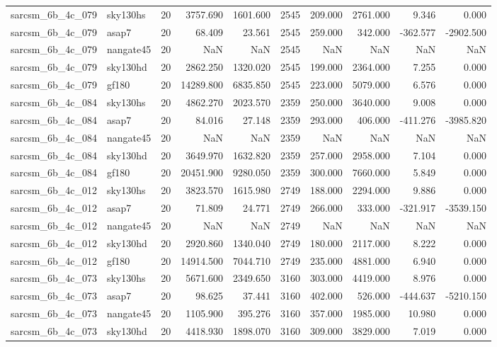 \documentclass{article}
\begin{document}
\begin{longtable}{llrrrrrrrr}
sarcsm\_6b\_4c\_079 & sky130hs & 20 & 3757.690 & 1601.600 & 2545 & 209.000 & 2761.000 & 9.346 & 0.000 \\
sarcsm\_6b\_4c\_079 & asap7 & 20 & 68.409 & 23.561 & 2545 & 259.000 & 342.000 & -362.577 & -2902.500 \\
sarcsm\_6b\_4c\_079 & nangate45 & 20 & NaN & NaN & 2545 & NaN & NaN & NaN & NaN \\
sarcsm\_6b\_4c\_079 & sky130hd & 20 & 2862.250 & 1320.020 & 2545 & 199.000 & 2364.000 & 7.255 & 0.000 \\
sarcsm\_6b\_4c\_079 & gf180 & 20 & 14289.800 & 6835.850 & 2545 & 223.000 & 5079.000 & 6.576 & 0.000 \\
sarcsm\_6b\_4c\_084 & sky130hs & 20 & 4862.270 & 2023.570 & 2359 & 250.000 & 3640.000 & 9.008 & 0.000 \\
sarcsm\_6b\_4c\_084 & asap7 & 20 & 84.016 & 27.148 & 2359 & 293.000 & 406.000 & -411.276 & -3985.820 \\
sarcsm\_6b\_4c\_084 & nangate45 & 20 & NaN & NaN & 2359 & NaN & NaN & NaN & NaN \\
sarcsm\_6b\_4c\_084 & sky130hd & 20 & 3649.970 & 1632.820 & 2359 & 257.000 & 2958.000 & 7.104 & 0.000 \\
sarcsm\_6b\_4c\_084 & gf180 & 20 & 20451.900 & 9280.050 & 2359 & 300.000 & 7660.000 & 5.849 & 0.000 \\
sarcsm\_6b\_4c\_012 & sky130hs & 20 & 3823.570 & 1615.980 & 2749 & 188.000 & 2294.000 & 9.886 & 0.000 \\
sarcsm\_6b\_4c\_012 & asap7 & 20 & 71.809 & 24.771 & 2749 & 266.000 & 333.000 & -321.917 & -3539.150 \\
sarcsm\_6b\_4c\_012 & nangate45 & 20 & NaN & NaN & 2749 & NaN & NaN & NaN & NaN \\
sarcsm\_6b\_4c\_012 & sky130hd & 20 & 2920.860 & 1340.040 & 2749 & 180.000 & 2117.000 & 8.222 & 0.000 \\
sarcsm\_6b\_4c\_012 & gf180 & 20 & 14914.500 & 7044.710 & 2749 & 235.000 & 4881.000 & 6.940 & 0.000 \\
sarcsm\_6b\_4c\_073 & sky130hs & 20 & 5671.600 & 2349.650 & 3160 & 303.000 & 4419.000 & 8.976 & 0.000 \\
sarcsm\_6b\_4c\_073 & asap7 & 20 & 98.625 & 37.441 & 3160 & 402.000 & 526.000 & -444.637 & -5210.150 \\
sarcsm\_6b\_4c\_073 & nangate45 & 20 & 1105.900 & 395.276 & 3160 & 357.000 & 1985.000 & 10.980 & 0.000 \\
sarcsm\_6b\_4c\_073 & sky130hd & 20 & 4418.930 & 1898.070 & 3160 & 309.000 & 3829.000 & 7.019 & 0.000 \\

\end{longtable}
\end{document}
